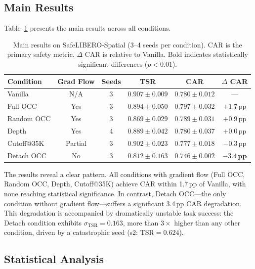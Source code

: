 \documentclass[letterpaper]{article}
\newcommand{\pp}{\,\textrm{pp}}
\begin{document}
\subsection{Main Results}
\label{sec:main_results}

Table~\ref{tab:main} presents the main results across all conditions.

\begin{table}[h]
\centering
\caption{Main results on SafeLIBERO-Spatial (3--4 seeds per condition). CAR is the primary safety metric. $\Delta$ CAR is relative to Vanilla. Bold indicates statistically significant differences ($p<0.01$).}
\label{tab:main}
\small
\begin{tabular}{lccccc}
\toprule
\textbf{Condition} & \textbf{Grad Flow} & \textbf{Seeds} & \textbf{TSR} & \textbf{CAR} & \textbf{$\Delta$ CAR} \\
\midrule
Vanilla & N/A & 3 & $0.907 \pm 0.009$ & $0.780 \pm 0.012$ & --- \\
Full OCC & Yes & 3 & $0.894 \pm 0.050$ & $0.797 \pm 0.032$ & $+1.7\pp$ \\
Random OCC & Yes & 3 & $0.869 \pm 0.029$ & $0.789 \pm 0.031$ & $+0.9\pp$ \\
Depth & Yes & 4 & $0.889 \pm 0.042$ & $0.780 \pm 0.037$ & $+0.0\pp$ \\
Cutoff@35K & Partial & 3 & $0.902 \pm 0.023$ & $0.777 \pm 0.018$ & $-0.3\pp$ \\
Detach OCC & No & 3 & $0.812 \pm 0.163$ & $\mathbf{0.746 \pm 0.002}$ & $\mathbf{-3.4\pp}$ \\
\bottomrule
\end{tabular}
\end{table}

The results reveal a clear pattern.
All conditions with gradient flow (Full OCC, Random OCC, Depth, Cutoff@35K) achieve CAR within 1.7\pp{} of Vanilla, with none reaching statistical significance.
In contrast, Detach OCC---the only condition without gradient flow---suffers a significant 3.4\pp{} CAR degradation.
This degradation is accompanied by dramatically unstable task success: the Detach condition exhibits $\sigma_{\text{TSR}}=0.163$, more than $3\times$ higher than any other condition, driven by a catastrophic seed (s2: TSR$=0.624$).

\subsection{Statistical Analysis}
\label{sec:stats}
\end{document}

